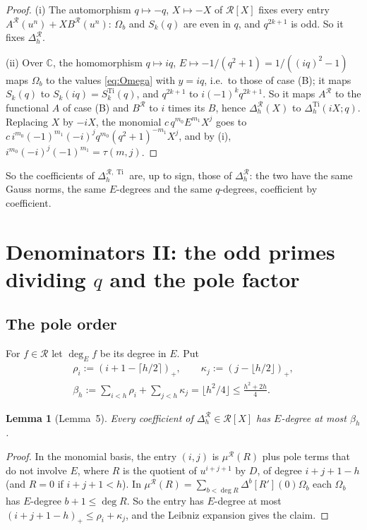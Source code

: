 \documentclass[11pt]{amsart}
\newtheorem{lemma}[theorem]{Lemma}
\theoremstyle{definition}
\theoremstyle{remark}
\numberwithin{equation}{section}
\newcommand{\CC}{\mathbb{C}}
\newcommand{\cR}{\mathcal{R}}
\newcommand{\Ti}{\operatorname{Ti}}
\newcommand{\Ed}{\deg_E}
\begin{document}
\begin{proof}
(i) The automorphism $q\mapsto-q$, $X\mapsto-X$ of $\cR[X]$ fixes every entry $A^{\cR}(u^n)+XB^{\cR}(u^n)$: $\Omega_b$ and
$S_k(q)$ are even in $q$, and $q^{2k+1}$ is odd. So it fixes $\Delta^{\cR}_h$.

(ii) Over $\CC$, the homomorphism $q\mapsto iq$, $E\mapsto-1/(q^2+1)=1/((iq)^2-1)$ maps $\Omega_b$ to the values
\eqref{eq:Omega} with $y=iq$, i.e.\ to those of case (B); it maps $S_k(q)$ to $S_k(iq)=S^{\Ti}_k(q)$, and $q^{2k+1}$ to
$i(-1)^kq^{2k+1}$. So it maps $A^{\cR}$ to the functional $A$ of case (B) and $B^{\cR}$ to $i$ times its $B$, hence
$\Delta^{\cR}_h(X)$ to $\Delta^{\Ti}_h(iX;q)$. Replacing $X$ by $-iX$, the monomial $c\,q^{m_0}E^{m_1}X^j$ goes to
$c\,i^{m_0}(-1)^{m_1}(-i)^jq^{m_0}(q^2+1)^{-m_1}X^j$, and by (i), $i^{m_0}(-i)^j(-1)^{m_1}=\tau(m,j)$.
\end{proof}

So the coefficients of $\Delta^{\cR,\Ti}_h$ are, up to sign, those of $\Delta^{\cR}_h$: the two have the same Gauss
norms, the same $E$-degrees and the same $q$-degrees, coefficient by coefficient.

\section{\texorpdfstring{Denominators II: the odd primes dividing $q$ and the pole factor}{Denominators II: the odd primes dividing q and the pole factor}}\label{sec:arith2}

\subsection{The pole order}
For $f\in\cR$ let $\Ed f$ be its degree in $E$. Put
\begin{gather*}
  \rho_i:=(i+1-\lceil h/2\rceil)_+,\qquad \kappa_j:=(j-\lfloor h/2\rfloor)_+,\\
  \beta_h:=\sum_{i<h}\rho_i+\sum_{j<h}\kappa_j=\lfloor h^2/4\rfloor\le\frac{h^2+2h}4 .
\end{gather*}

\begin{lemma}[Lemma~5]\label{lem:poleorder}
Every coefficient of $\Delta^{\cR}_h\in\cR[X]$ has $E$-degree at most $\beta_h$.
\end{lemma}

\begin{proof}
In the monomial basis, the entry $(i,j)$ is $\mu^{\cR}(R)$ plus pole terms that do not involve $E$, where $R$ is the
quotient of $u^{i+j+1}$ by $D$, of degree $i+j+1-h$ (and $R=0$ if $i+j+1<h$). In $\mu^{\cR}(R)=\sum_{b<\deg R}\Delta^b[R'](0)\Omega_b$
each $\Omega_b$ has $E$-degree $b+1\le\deg R$. So the entry has $E$-degree at most $(i+j+1-h)_+\le\rho_i+\kappa_j$, and
the Leibniz expansion gives the claim.
\end{proof}
\end{document}
